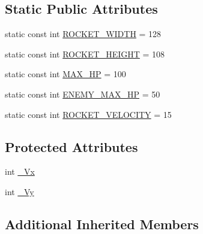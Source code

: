 \subsection*{Static Public Attributes}
\begin{DoxyCompactItemize}
\item 
static const int \hyperlink{class_rocket_ac8b2266f7e3aa777aca1b0144722a0db}{R\-O\-C\-K\-E\-T\-\_\-\-W\-I\-D\-T\-H} = 128
\item 
static const int \hyperlink{class_rocket_a5096c34316cb2b6116b3971f0cbb56f2}{R\-O\-C\-K\-E\-T\-\_\-\-H\-E\-I\-G\-H\-T} = 108
\item 
static const int \hyperlink{class_rocket_ad631a51a51c3dcbb927604c6b498498d}{M\-A\-X\-\_\-\-H\-P} = 100
\item 
static const int \hyperlink{class_rocket_adf93733f7bd7643acfb98d5e9feab7c5}{E\-N\-E\-M\-Y\-\_\-\-M\-A\-X\-\_\-\-H\-P} = 50
\item 
static const int \hyperlink{class_rocket_a1a590b76e2cc310e566f2624265f5c47}{R\-O\-C\-K\-E\-T\-\_\-\-V\-E\-L\-O\-C\-I\-T\-Y} = 15
\end{DoxyCompactItemize}
\subsection*{Protected Attributes}
\begin{DoxyCompactItemize}
\item 
int \hyperlink{class_rocket_af29030dcde63c0c11f394855eabeb035}{\-\_\-\-Vx}
\item 
int \hyperlink{class_rocket_a8755419e9cbd841f0ca08e9203d5d51b}{\-\_\-\-Vy}
\end{DoxyCompactItemize}
\subsection*{Additional Inherited Members}


